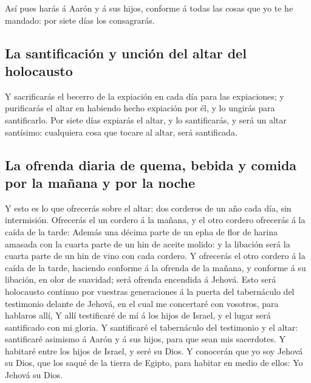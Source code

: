  Así pues harás á Aarón y á sus hijos, conforme á todas las
cosas que yo te he mandado: por siete días los consagrarás.

\hypertarget{la-santificaciuxf3n-y-unciuxf3n-del-altar-del-holocausto}{%
\subsection{La santificación y unción del altar del
holocausto}\label{la-santificaciuxf3n-y-unciuxf3n-del-altar-del-holocausto}}

 Y sacrificarás el becerro de la expiación en cada día para
las expiaciones; y purificarás el altar en habiendo hecho expiación por
él, y lo ungirás para santificarlo.  Por siete días
expiarás el altar, y lo santificarás, y será un altar santísimo:
cualquiera cosa que tocare al altar, será santificada.

\hypertarget{la-ofrenda-diaria-de-quema-bebida-y-comida-por-la-mauxf1ana-y-por-la-noche}{%
\subsection{La ofrenda diaria de quema, bebida y comida por la mañana y
por la
noche}\label{la-ofrenda-diaria-de-quema-bebida-y-comida-por-la-mauxf1ana-y-por-la-noche}}

 Y esto es lo que ofrecerás sobre el altar: dos corderos de
un año cada día, sin intermisión.  Ofrecerás el un cordero
á la mañana, y el otro cordero ofrecerás á la caída de la tarde:
 Además una décima parte de un epha de flor de harina
amasada con la cuarta parte de un hin de aceite molido: y la libación
será la cuarta parte de un hin de vino con cada cordero.  Y
ofrecerás el otro cordero á la caída de la tarde, haciendo conforme á la
ofrenda de la mañana, y conforme á su libación, en olor de suavidad;
será ofrenda encendida á Jehová.  Esto será holocausto
continuo por vuestras generaciones á la puerta del tabernáculo del
testimonio delante de Jehová, en el cual me concertaré con vosotros,
para hablaros allí,  Y allí testificaré de mí á los hijos
de Israel, y el lugar será santificado con mi gloria.  Y
santificaré el tabernáculo del testimonio y el altar: santificaré
asimismo á Aarón y á sus hijos, para que sean mis sacerdotes.
 Y habitaré entre los hijos de Israel, y seré su Dios.
 Y conocerán que yo soy Jehová su Dios, que los saqué de la
tierra de Egipto, para habitar en medio de ellos: Yo Jehová su Dios.


